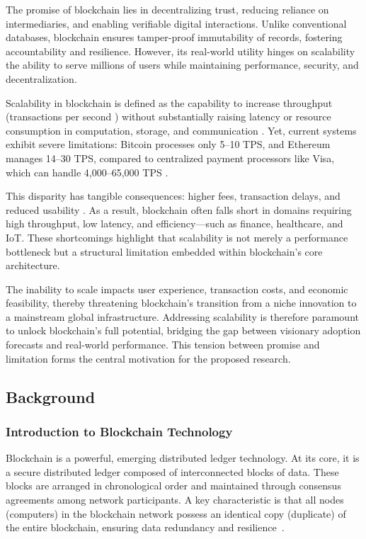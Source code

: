 The promise of blockchain lies in decentralizing trust, reducing reliance on intermediaries, and enabling verifiable digital interactions. Unlike conventional databases, blockchain ensures tamper-proof immutability of records, fostering accountability and resilience. However, its real-world utility hinges on scalability the ability to serve millions of users while maintaining performance, security, and decentralization.

\vspace{12pt}

Scalability in blockchain is defined as the capability to increase throughput (transactions per second \cite{ledger2023tps}) without substantially raising latency or resource consumption in computation, storage, and communication \cite{reddio2025scalability}. Yet, current systems exhibit severe limitations: Bitcoin processes only 5–10 TPS, and Ethereum manages 14–30 TPS, compared to centralized payment processors like Visa, which can handle 4,000–65,000 TPS \cite{buterin2014ethereum}.

\vspace{12pt}

This disparity has tangible consequences: higher fees, transaction delays, and reduced usability \cite{slogix2025scalability}. As a result, blockchain often falls short in domains requiring high throughput, low latency, and efficiency—such as finance, healthcare, and IoT. These shortcomings highlight that scalability is not merely a performance bottleneck but a structural limitation embedded within blockchain’s core architecture.

\vspace{12pt}

The inability to scale impacts user experience, transaction costs, and economic feasibility, thereby threatening blockchain’s transition from a niche innovation to a mainstream global infrastructure. Addressing scalability is therefore paramount to unlock blockchain’s full potential, bridging the gap between visionary adoption forecasts and real-world performance. This tension between promise and limitation forms the central motivation for the proposed research.

\vspace{12pt}
\subsection{Background}
\vspace{12pt}
\subsubsection{Introduction to Blockchain Technology}
\vspace{12pt}
Blockchain is a powerful, emerging distributed ledger technology. At its core, it is a secure distributed ledger composed of interconnected blocks of data. These blocks are arranged in chronological order and maintained through consensus agreements among network participants. A key characteristic is that all nodes (computers) in the blockchain network possess an identical copy (duplicate) of the entire blockchain, ensuring data redundancy and resilience~\cite{sanka2021systematic}.

